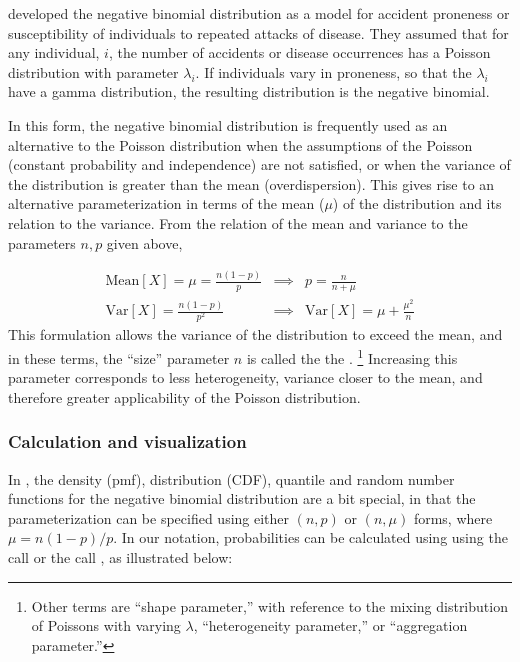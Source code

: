 \documentclass[11pt]{book}
\begin{document}
\citet{GreenwoodYule:20}
developed the negative binomial distribution as a model for
accident proneness or susceptibility of individuals to
repeated attacks of disease.
They assumed that for any individual, $i$, the number of accidents
or disease occurrences has a Poisson distribution with parameter
$\lambda_i$.
If individuals vary in proneness, so that the $\lambda_i$ have
a gamma distribution, the resulting distribution is the
negative binomial.

In this form, the negative binomial distribution is frequently used
as an alternative to the Poisson distribution when the assumptions
of the Poisson (constant probability and independence) are not
satisfied, or when the variance of the distribution is greater
than the mean (overdispersion).
This gives rise to an alternative parameterization in terms of the
mean ($\mu$) of the distribution and its relation to the variance.
From the relation of the mean and variance to the parameters
$n, p$ given above,

\begin{eqnarray}
\textrm{Mean}[X] = \mu = \frac{n (1-p)}{p} & \implies & p = \frac{n}{n+\mu} \\
\textrm{Var}[X] = \frac{n (1-p)}{p^2} & \implies & \textrm{Var}[X] = \mu + \frac{\mu^2}{n}
\end{eqnarray}
This formulation allows the variance of the distribution to exceed the mean,
and in these terms, the ``size'' parameter $n$ is called the the
.%
\footnote{
Other terms are ``shape parameter,'' with reference to the mixing distribution
of Poissons with varying $\lambda$, 
``heterogeneity parameter,'' or ``aggregation parameter.''
}
Increasing this parameter corresponds to less heterogeneity, variance closer
to the mean, and therefore greater applicability of the Poisson distribution.

\subsubsection{Calculation and visualization}

In \R, the density (pmf), distribution (CDF), quantile and random number functions
for the negative binomial distribution are a bit special, in that the parameterization
can be specified using either $(n, p)$ or $(n, \mu)$ forms,
where $\mu = n (1-p) /p$.
In our notation, probabilities can be calculated using 
using the call 
or the call , as illustrated below:
\end{document}
